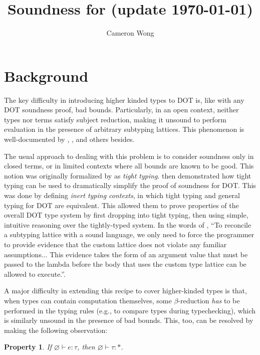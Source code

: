 \documentclass[a4paper, 10pt]{article}
\title{Soundness for \DOTw{} (update \today)}
\author{Cameron Wong}
\newtheorem{property}{Property}
\begin{document}
\maketitle

\setlength{\parskip}{\baselineskip}

\iffalse
\section{Background}

The key difficulty in introducing higher kinded types to DOT is, like with any
DOT soundness proof, bad bounds. Particularly, in an open context, neither
types nor terms satisfy subject reduction, making it unsound to perform
evaluation in the presence of arbitrary subtyping lattices. This phenomenon
is well-documented by \citet{amin2016}, \citet{rapoport2017},
\citet{stucki2017} and others besides.

The usual approach to dealing with this problem is to consider soundness only
in closed terms, or in limited contexts where all bounds are known to be good.
This notion was originally formalized by \citet{amin2016} as \emph{tight
typing}. \citet{rapoport2017} then demonstrated how tight typing can be used to
dramatically simplify the proof of soundness for DOT. This was done by defining
\emph{inert typing contexts}, in which tight typing and general typing for DOT
are equivalent. This allowed them to prove properties of the overall DOT type
system by first dropping into tight typing, then using simple, intuitive
reasoning over the tightly-typed system. In the words of \citet{rapoport2017},
``To reconcile a subtyping lattice with a sound language, we only need to force
the programmer to provide evidence that the custom lattice does not violate any
familiar assumptions... This evidence takes the form of an argument value that
must be passed to the lambda before the body that uses the custom type lattice
can be allowed to execute.''.

A major difficulty in extending this recipe to cover higher-kinded types is
that, when types can contain computation themselves, some $\beta$-reduction
\emph{has} to be performed in the typing rules (e.g., to compare types during
typechecking), which is similarly unsound in the presence of bad bounds.
This, too, can be resolved by making the following observation:

\begin{property}
  If $\varnothing \vdash e : \tau$, then $\varnothing \vdash \tau : *$.
\end{property}
\end{document}
